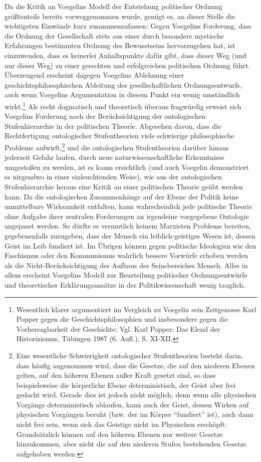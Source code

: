 Da die Kritik an Voegelins Modell der Entstehung politischer Ordnung
größtenteils bereits vorweggenommen wurde, genügt es, an dieser Stelle
die wichtigsten Einwände kurz zusammenzufassen: Gegen Voegelins
Forderung, dass die Ordnung der Gesellschaft stets aus einer durch
besondere mystische Erfahrungen bestimmten Ordnung des Bewusstseins
hervorzugehen hat, ist einzuwenden, dass es keinerlei Anhaltspunkte dafür
gibt, dass dieser Weg (und nur dieser Weg) zu einer gerechten und
erfolgreichen politischen Ordnung führt. Überzeugend erscheint dagegen
Voegelins Ablehnung einer geschichtsphilosophischen Ableitung des
gesellschaftlichen Ordnungsentwurfs, auch wenn Voegelins Argumentation
in diesem Punkt ein wenig umständlich wirkt.\footnote{Wesentlich klarer
  argumentiert im Vergleich zu Voegelin sein Zeitgenosse Karl Popper
  gegen die Geschichtsphilosophien und insbesondere gegen die
  Vorhersagbarkeit der Geschichte: Vgl. Karl Popper: Das Elend der
  Historizismus, Tübingen 1987 (6. Aufl.), S. XI-XII.} Als recht
dogmatisch und theoretisch überaus fragwürdig erweist sich Voegelins
Forderung nach der Berücksichtigung der ontologischen Stufenhierarchie
in der politischen Theorie. Abgesehen davon, dass die Rechtfertigung
ontologischer Stufentheorien viele schwierige philosophische Probleme
aufwirft,\footnote{Eine wesentliche Schwierigkeit ontologischer
  Stufentheorien besteht darin, dass häufig angenommen wird, dass die
  Gesetze, die auf den niederen Ebenen gelten, auf den höheren Ebenen
  außer Kraft gesetzt sind, so dass beispielsweise die körperliche Ebene
  deterministisch, der Geist aber frei gedacht wird. Gerade dies ist
  jedoch nicht möglich, denn wenn alle physischen Vorgänge
  deterministisch ablaufen, kann auch der Geist, dessen Wirken auf
  physischen Vorgängen beruht (bzw. der im Körper "`fundiert"' ist),
  auch dann nicht frei sein, wenn sich das Geistige nicht im Physischen
  erschöpft: Grundsätzlich können auf den höheren Ebenen nur weitere
  Gesetze hinzukommen, aber nicht die auf den niederen Stufen
  bestehenden Gesetze aufgehoben werden.} und die ontologischen
Stufentheorien darüber hinaus jederzeit Gefahr laufen, durch neue
naturwissenschaftliche Erkenntnisse umgestoßen zu werden, ist es kaum
ersichtlich (und auch Voegelin demonstriert es nirgendwo in einer
einleuchtenden Weise), wie aus der ontologischen Stufenhierarchie heraus
eine Kritik an einer politischen Theorie geübt werden kann. Da die
ontologischen Zusammenhänge auf der Ebene der Politik keine unmittelbare
Wirksamkeit entfalten, kann wahrscheinlich jede politische Theorie ohne
Aufgabe ihrer zentralen Forderungen an irgendeine vorgegebene Ontologie
angepasst werden. So dürfte es vermutlich keinem Marxisten Probleme
bereiten, gegebenenfalls zuzugeben, dass der Mensch ein
leiblich-geistiges Wesen ist, dessen Geist im Leib fundiert ist. Im
Übrigen können gegen politische Ideologien wie den Faschismus oder den
Kommunismus wahrlich bessere Vorwürfe erhoben werden als die
Nicht-Berücksichtigung des Aufbaus des Seinsbereiches Mensch. Alles in
allem erscheint Voegelins Modell zur Beurteilung politischer
Ordnungsentwürfe und theoretischer Erklärungsansätze in der
Politikwissenschaft wenig tauglich.

